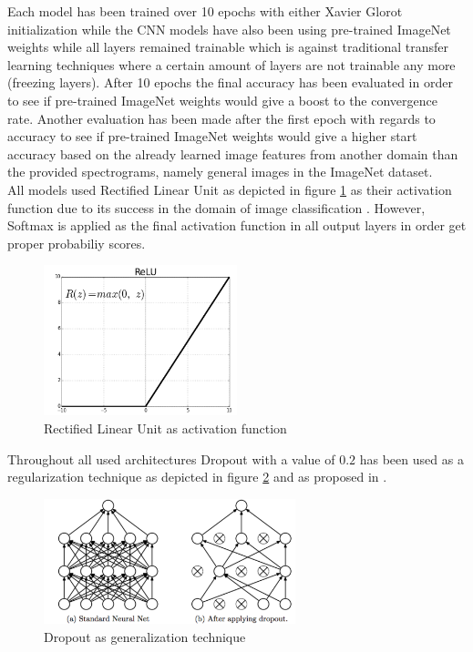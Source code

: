 \documentclass{article}
\theoremstyle{definition}
\theoremstyle{remark}
\begin{document}
Each model has been trained over 10 epochs with either Xavier Glorot initialization while the CNN models have also been using pre-trained ImageNet weights while all layers remained trainable which is against traditional transfer learning techniques where a certain amount of layers are not trainable any more (freezing layers). After 10 epochs the final accuracy has been evaluated in order to see if pre-trained ImageNet weights would give a boost to the convergence rate. Another evaluation has been made after the first epoch with regards to accuracy to see if pre-trained ImageNet weights would give a higher start accuracy based on the already learned image features from another domain than the provided spectrograms, namely general images in the ImageNet dataset.\\

All models used Rectified Linear Unit as depicted in figure \ref{fig:relu} as their activation function due to its success in the domain of image classification \cite{dahl2013improving}. However, Softmax is applied as the final activation function in all output layers in order get proper probabiliy scores.



\begin{figure}[h!]
    \centering
    \includegraphics[width=0.5\textwidth]{img/relu.png}
    \caption{Rectified Linear Unit as activation function}
    \label{fig:relu}
\end{figure}

Throughout all used architectures Dropout \cite{srivastava2014dropout} with a value of $0.2$ has been used as a regularization technique as depicted in figure \ref{fig:dropout} and as proposed in \cite{dahl2013improving}.


\begin{figure}[h!]
    \centering
    \includegraphics[width=0.65\textwidth]{img/dropout.png}
    \caption{Dropout as generalization technique}
    \label{fig:dropout}
\end{figure}
\end{document}
